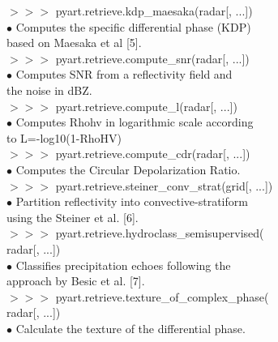 \documentclass[potrait,a0paper,fontscale=0.33]{baposter} %
\begin{document}
\begin{poster}
{\begin{flushleft}
$>$$>$$>$ pyart.retrieve.kdp\_maesaka(radar[, ...])\\
\-\hspace{0.4cm} $\bullet$ Computes the specific differential phase (KDP)\\
\-\hspace{0.7cm} based on Maesaka et al [5].\\
$>$$>$$>$ pyart.retrieve.compute\_snr(radar[, ...])\\
\-\hspace{0.4cm} $\bullet$ Computes SNR from a reflectivity field and\\
\-\hspace{0.7cm} the noise in dBZ.\\
$>$$>$$>$ pyart.retrieve.compute\_l(radar[, ...])\\
\-\hspace{0.4cm} $\bullet$ Computes Rhohv in logarithmic scale according\\
\-\hspace{0.7cm} to L=-log10(1-RhoHV)\\
$>$$>$$>$ pyart.retrieve.compute\_cdr(radar[, ...])\\
\-\hspace{0.4cm} $\bullet$ Computes the Circular Depolarization Ratio.\\
$>$$>$$>$ pyart.retrieve.steiner\_conv\_strat(grid[, ...])\\
\-\hspace{0.4cm} $\bullet$ Partition reflectivity into convective-stratiform\\
\-\hspace{0.7cm} using the Steiner et al. [6].\\
$>$$>$$>$ pyart.retrieve.hydroclass\_semisupervised(\\
\-\hspace{1.5cm} radar[, ...])\\
\-\hspace{0.4cm} $\bullet$ Classifies precipitation echoes following the\\
\-\hspace{0.7cm} approach by Besic et al. [7].\\
$>$$>$$>$ pyart.retrieve.texture\_of\_complex\_phase(\\
\-\hspace{1.5cm} radar[, ...])\\
\-\hspace{0.4cm} $\bullet$ Calculate the texture of the differential phase.\\

\end{flushleft}}
\end{poster}
\end{document}
